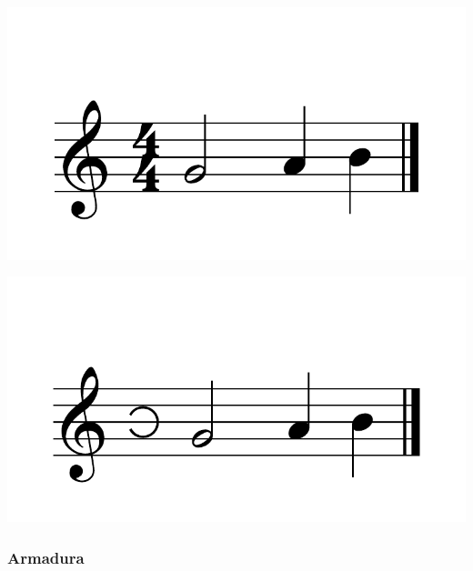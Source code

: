 \documentclass{article}
\begin{document}
\includegraphics[scale=0.5]{figures_tests/pdf/skern/commonmeter3.pdf}

\includegraphics[scale=0.5]{figures_tests/pdf/skern/commonmeter4.pdf}


\subsubsection{Armadura}
\end{document}
